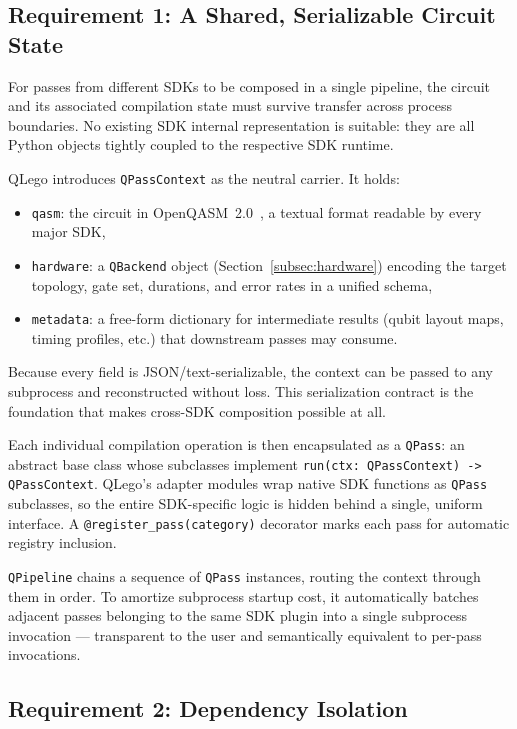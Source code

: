 \documentclass[conference]{IEEEtran}
\begin{document}
\subsection{Requirement 1: A Shared, Serializable Circuit State}
\label{subsec:context}

For passes from different SDKs to be composed in a single pipeline, the circuit and its associated compilation state must survive transfer across process boundaries.
No existing SDK internal representation is suitable: they are all Python objects tightly coupled to the respective SDK runtime.

QLego introduces \texttt{QPassContext} as the neutral carrier.
It holds:
\begin{itemize}[nosep]
    \item \texttt{qasm}: the circuit in OpenQASM~2.0~\cite{cross2022openqasm3}, a textual format readable by every major SDK,
    \item \texttt{hardware}: a \texttt{QBackend} object (Section~\ref{subsec:hardware}) encoding the target topology, gate set, durations, and error rates in a unified schema,
    \item \texttt{metadata}: a free-form dictionary for intermediate results (qubit layout maps, timing profiles, etc.) that downstream passes may consume.
\end{itemize}
Because every field is JSON/text-serializable, the context can be passed to any subprocess and reconstructed without loss.
This serialization contract is the foundation that makes cross-SDK composition possible at all.

Each individual compilation operation is then encapsulated as a \texttt{QPass}: an abstract base class whose subclasses implement \texttt{run(ctx: QPassContext) -> QPassContext}.
QLego's adapter modules wrap native SDK functions as \texttt{QPass} subclasses, so the entire SDK-specific logic is hidden behind a single, uniform interface.
A \texttt{@register\_pass(category)} decorator marks each pass for automatic registry inclusion.

\texttt{QPipeline} chains a sequence of \texttt{QPass} instances, routing the context through them in order.
To amortize subprocess startup cost, it automatically batches adjacent passes belonging to the same SDK plugin into a single subprocess invocation — transparent to the user and semantically equivalent to per-pass invocations.

\subsection{Requirement 2: Dependency Isolation}
\label{subsec:isolation}
\end{document}
